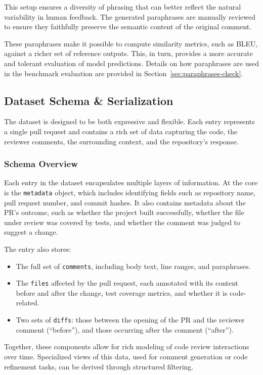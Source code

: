 This setup ensures a diversity of phrasing that can better reflect the natural variability in human
feedback. The generated paraphrases are manually reviewed to ensure they faithfully preserve the
semantic content of the original comment.

These paraphrases make it possible to compute similarity metrics, such as BLEU, against a richer set
of reference outputs. This, in turn, provides a more accurate and tolerant evaluation of model
predictions. Details on how paraphrases are used in the benchmark evaluation are provided in
Section~\ref{sec:paraphrases-check}.

\subsection{Dataset Schema \& Serialization}

The dataset is designed to be both expressive and flexible. Each entry represents a single pull
request and contains a rich set of data capturing the code, the reviewer comments, the surrounding
context, and the repository’s response.

\subsubsection{Schema Overview}

Each entry in the dataset encapsulates multiple layers of information. At the core is the
\texttt{metadata} object, which includes identifying fields such as repository name, pull request
number, and commit hashes. It also contains metadata about the PR’s outcome, such as whether the
project built successfully, whether the file under review was covered by tests, and whether the
comment was judged to suggest a change.

The entry also stores:
\begin{itemize}
	\item The full set of \texttt{comments}, including body text, line ranges, and paraphrases.
	\item The \texttt{files} affected by the pull request, each annotated with its content before
	      and after the change, test coverage metrics, and whether it is code-related.
	\item Two sets of \texttt{diffs}: those between the opening of the PR and the reviewer comment
	      (``before''), and those occurring after the comment (``after'').
\end{itemize}

Together, these components allow for rich modeling of code review interactions over time.
Specialized views of this data, used for comment generation or code refinement tasks, can be derived
through structured filtering.

